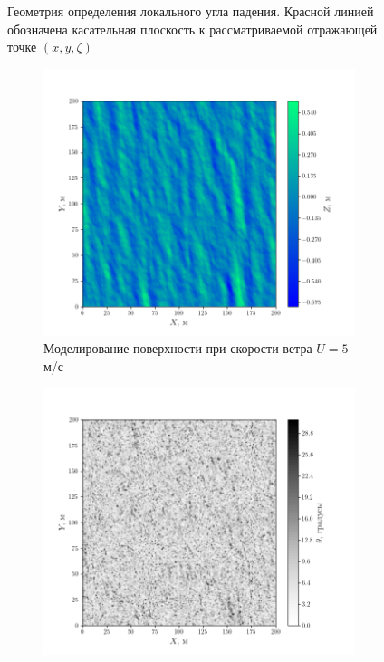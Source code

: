 \begin{figure}[h!]
    \centering
    
    \caption{Геометрия определения локального угла падения. Красной линией
    обозначена касательная плоскость к рассматриваемой отражающей точке
$(x,y,\zeta)$}
    \label{fig:local_theta}
\end{figure}

\begin{figure}[h]
    \centering
    \begin{subfigure}{0.65\linewidth}
        \centering
        \includegraphics[width=\linewidth]{fig/impulse/fig1}
        \caption{Моделирование поверхности при скорости ветра $U=5$ м/с}
        \label{fig:mirror:a}
    \end{subfigure}
    \begin{subfigure}{.49\linewidth}
        \centering
        \includegraphics[width=\linewidth]{fig/impulse/fig2}

\end{subfigure}
\end{figure}
